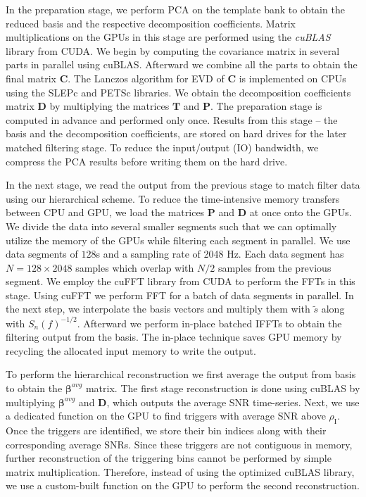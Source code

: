 In the preparation stage, we perform PCA on the template bank to obtain the reduced basis and the respective decomposition coefficients. Matrix multiplications on the GPUs in this stage are performed using the \textit{cuBLAS} library from CUDA. We begin by computing the covariance matrix in several parts in parallel using cuBLAS. Afterward we combine all the parts to obtain the final matrix $\textbf{C}$. The Lanczos algorithm for EVD of $\textbf{C}$ is implemented on CPUs using the SLEPc \cite{SLEPc} and PETSc \cite{PETSc} libraries. We obtain the decomposition coefficients matrix $\mathbf{D}$ by multiplying the matrices $\textbf{T}$ and $\textbf{P}$. The preparation stage is computed in advance and performed only once. Results from this stage -- the basis and the decomposition coefficients, are stored on hard drives for the later matched filtering stage. To reduce the input/output (IO) bandwidth, we compress the PCA results before writing them on the hard drive.  

In the next stage, we read the output from the previous stage to match filter data using our hierarchical scheme. To reduce the time-intensive memory transfers between CPU and GPU, we load the matrices $\mathbf{P}$ and $\mathbf{D}$ at once onto the GPUs. We divide the data into several smaller segments such that we can optimally utilize the memory of the GPUs while filtering each segment in parallel. We use data segments of $128$s and a sampling rate of 2048 Hz. Each data segment has $N = 128 \times 2048$ samples which overlap with $N/2$ samples from the previous segment. We employ the cuFFT library from CUDA to perform the FFTs in this stage. Using cuFFT we perform FFT for a batch of data segments in parallel. In the next step, we interpolate the basis vectors and multiply them with $\tilde{s}$ along with $S_n(f)^{-1/2}$. Afterward we perform in-place batched IFFTs to obtain the filtering output from the basis. The in-place technique saves GPU memory by recycling the allocated input memory to write the output.  

To perform the hierarchical reconstruction we first average the output from basis to obtain the $\pmb{\beta}^{avg} $ matrix. The first stage reconstruction is done using cuBLAS by multiplying $\pmb{\beta}^{avg}$ and $\textbf{D}$, which outputs the average SNR time-series. Next, we use a dedicated function on the GPU to find triggers with average SNR above $\rho_{\text{I}}$. Once the triggers are identified, we store their bin indices along with their corresponding average SNRs. Since these triggers are not contiguous in memory, further reconstruction of the triggering bins cannot be performed by simple matrix multiplication. Therefore, instead of using the optimized cuBLAS library, we use a custom-built function on the GPU to perform the second reconstruction. 


